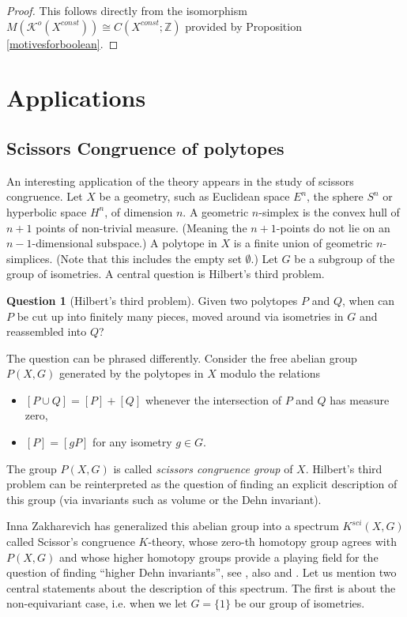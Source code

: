\documentclass[10pt]{amsart}
\theoremstyle{definition}
\newtheorem{question}[theorem]{Question}
\begin{document}
\begin{proof}
This follows directly from the isomorphism $M(\mathcal{K}^o(X^{const})) \cong C(X^{const}; \mathbb{Z})$ provided by Proposition \ref{motivesforboolean}.
\end{proof}




\section{Applications}

\subsection{Scissors Congruence of polytopes} \label{scissorscongr}

An interesting application of the theory appears in the study of scissors congruence. Let $X$ be a geometry, such as Euclidean space $E^n$, the sphere $S^n$ or hyperbolic space $H^n$, of dimension $n$. A geometric $n$-simplex is the convex hull of $n+1$ points of non-trivial measure. (Meaning the $n+1$-points do not lie on an $n-1$-dimensional subspace.) A polytope in $X$ is a finite union of geometric $n$-simplices. (Note that this includes the empty set $\emptyset$.) Let $G$ be a subgroup of the group of isometries. A central question is Hilbert's third problem.

\begin{question}[Hilbert's third problem]
Given two polytopes $P$ and $Q$, when can $P$ be cut up into finitely many pieces, moved around via isometries in $G$ and reassembled into $Q$?
\end{question}

The question can be phrased differently. Consider the free abelian group $P(X,G)$ generated by the polytopes in $X$ modulo the relations
\begin{itemize}
\item $[P \cup Q] = [P] + [Q]$ whenever the intersection of $P$ and $Q$ has measure zero,
\item $[P] = [gP]$ for any isometry $g \in G$.
\end{itemize}
The group $P(X,G)$ is called \emph{scissors congruence group} of $X$. Hilbert's third problem can be reinterpreted as the question of finding an explicit description of this group (via invariants such as volume or the Dehn invariant).

Inna Zakharevich has generalized this abelian group into a spectrum $K^{sci}(X,G)$ called Scissor's congruence $K$-theory, whose zero-th homotopy group agrees with $P(X,G)$ and whose higher homotopy groups provide a playing field for the question of finding ``higher Dehn invariants'', see \cite{zakharevich2011scissorscongruencektheory}, also \cite{malkiewich2024higherscissorscongruence} and \cite{kupers2024scissorsautomorphismgroupshomology}. Let us mention two central statements about the description of this spectrum. The first is about the non-equivariant case, i.e. when we let $G = \{1\}$ be our group of isometries.
\end{document}
